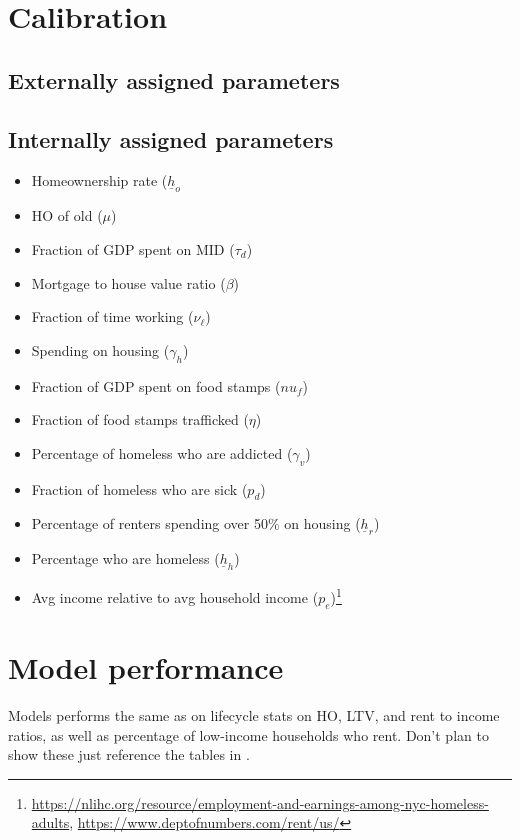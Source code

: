 \documentclass[parskip=full]{article}
\begin{document}
\section{Calibration}

\subsection{Externally assigned parameters}

\subsection{Internally assigned parameters}

\begin{itemize}
    \item Homeownership rate ($\underline{h}_{o}$
    \item HO of old ($\mu$)
    \item Fraction of GDP spent on MID ($\tau_{d}$)
    \item Mortgage to house value ratio ($\beta$)
    \item Fraction of time working ($\nu_{\ell}$)
    \item Spending on housing ($\gamma_{h}$)
    \item Fraction of GDP spent on food stamps ($nu_{f}$)
    \item Fraction of food stamps trafficked ($\eta$)
    \item Percentage of homeless who are addicted ($\gamma_{v}$)
    \item Fraction of homeless who are sick ($p_{d}$)
    \item Percentage of renters spending over 50\% on housing ($\underline{h}_{r}$)
    \item Percentage who are homeless ($\underline{h}_{h}$)
    \item Avg income relative to avg household income  ($p_{e}$)\footnote{\url{https://nlihc.org/resource/employment-and-earnings-among-nyc-homeless-adults}, \url{https://www.deptofnumbers.com/rent/us/}}
\end{itemize}

\section{Model performance}
Models performs the same as \cite{rs-2023} on lifecycle stats on HO, LTV, and rent to income ratios, as well as percentage of low-income households who rent. Don't plan to show these just reference the tables in \citet{rs-2023}. 
\end{document}
